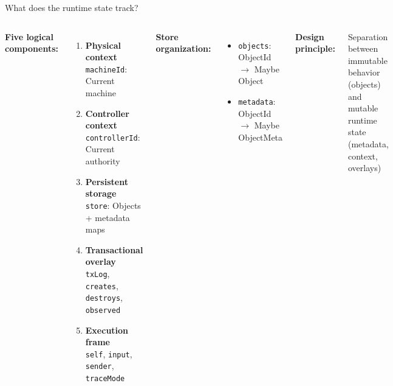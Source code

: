 \documentclass[handout,aspectratio=169,xcolor=dvipsnames,10pt]{beamer}
\begin{document}
\begin{frame}{What does the runtime state track?}

\begin{columns}[T]

\textbf{Five logical components:}

\begin{enumerate}\small
  \item \textbf{Physical context}\\
  {\footnotesize\texttt{machineId}: Current machine}

  \vspace{0.2em}

  \item \textbf{Controller context}\\
  {\footnotesize\texttt{controllerId}: Current authority}

  \vspace{0.2em}

  \item \textbf{Persistent storage}\\
  {\footnotesize\texttt{store}: Objects + metadata maps}

  \vspace{0.2em}

  \item \textbf{Transactional overlay}\\
  {\footnotesize\texttt{txLog}, \texttt{creates}, \texttt{destroys}, \texttt{observed}}

  \vspace{0.2em}

  \item \textbf{Execution frame}\\
  {\footnotesize\texttt{self}, \texttt{input}, \texttt{sender}, \texttt{traceMode}}
\end{enumerate}


\textbf{Store organization:}

\vspace{0.5em}

\begin{itemize}\small
  \item \texttt{objects}: ObjectId $\to$ Maybe Object
  \item \texttt{metadata}: ObjectId $\to$ Maybe ObjectMeta
\end{itemize}

\vspace{1em}

\textbf{Design principle:}

\vspace{0.3em}

{\small Separation between immutable behavior (objects) and mutable runtime state (metadata, context, overlays)}

\end{columns}

\vfill

\end{frame}
\end{document}
